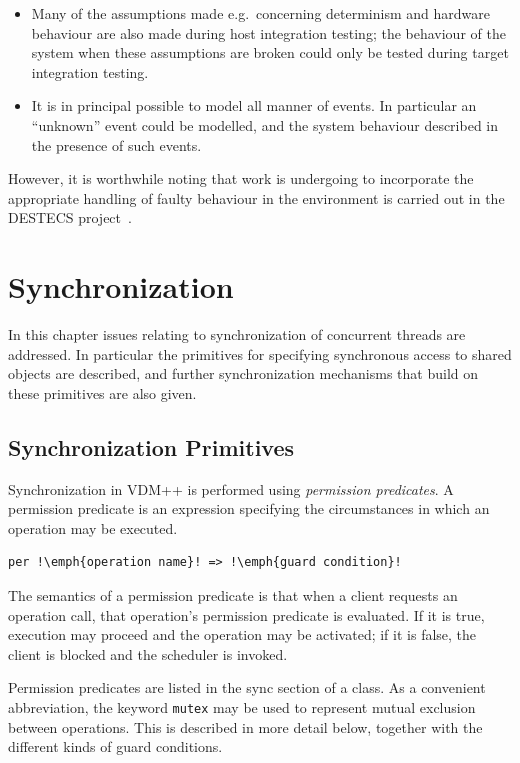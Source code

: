 \documentclass{overturerepchap}
\begin{document}
\begin{itemize}
\item Many of the assumptions made e.g.\ concerning determinism and
hardware behaviour are also made during host integration testing;
the behaviour of the system when these assumptions are broken could
only be tested during target integration testing.
\item It is in principal possible to model all manner of events. In
particular an ``unknown'' event could be modelled, and the system
behaviour described in the presence of such events.
\end{itemize}

However, it is worthwhile noting that work is undergoing to
incorporate the appropriate handling of faulty behaviour in the
environment is carried out in the DESTECS project~\cite{Broenink&10,Fitzgerald&10b}. 

\chapter{Synchronization}\label{chap:sync}

In this chapter issues relating to synchronization of concurrent
threads are addressed.  In particular the primitives for specifying
synchronous access to shared objects are described, and further
synchronization mechanisms that build on these primitives are also
given.

\section{Synchronization Primitives}

Synchronization in VDM++ is performed using \emph{permission predicates}. A
permission predicate is an expression specifying the circumstances in
which an operation may be executed.

\begin{lstlisting}
per !\emph{operation name}! => !\emph{guard condition}!
\end{lstlisting}

The semantics of a permission predicate is that when a client requests
an operation call, that operation's permission predicate is
evaluated. If it is true, execution may proceed and the operation may
be activated; if it is false, the client is blocked and the scheduler
is invoked.

Permission predicates are listed in the sync section of a class. As a
convenient abbreviation, the keyword \texttt{mutex} may be used to represent
mutual exclusion between operations. This is described in more detail
below, together with the different kinds of guard conditions.
\end{document}
